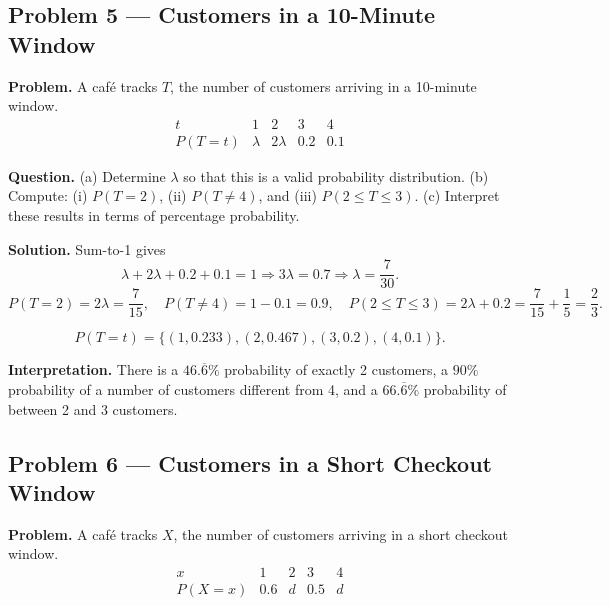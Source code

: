 \begin{ExamProblems}
		
		\item
		\subsection*{Problem 5 — Customers in a 10-Minute Window}
		
		\textbf{Problem.}
		A café tracks $T$, the number of customers arriving in a 10-minute window.
		\[
		\begin{array}{c|cccc}
			t & 1 & 2 & 3 & 4\\
			\hline
			P(T=t) & \lambda & 2\lambda & 0.2 & 0.1
		\end{array}
		\]
		
		\textbf{Question.}
		(a) Determine $\lambda$ so that this is a valid probability distribution.
		(b) Compute: (i) $P(T=2)$, (ii) $P(T\ne 4)$, and (iii) $P(2\le T\le 3)$.
		(c) Interpret these results in terms of percentage probability.
		
		\textbf{Solution.}
		Sum-to-1 gives
		\[
		\lambda+2\lambda+0.2+0.1=1\Rightarrow 3\lambda=0.7\Rightarrow \lambda=\frac{7}{30}.
		\]
		\[
		P(T=2)=2\lambda=\frac{7}{15},\quad
		P(T\ne 4)=1-0.1=0.9,\quad
		P(2\le T\le 3)=2\lambda+0.2=\frac{7}{15}+\frac{1}{5}=\frac{2}{3}.
		\]
		
\[
		P(T=t)=\{(1,0.233),(2,0.467),(3,0.2),(4,0.1)\}.
		\]
\begin{center}
		\end{center}
\textbf{Interpretation.} There is a $46.\overline{6}\%$ probability of exactly 2 customers, a $90\%$ probability of a number of customers different from 4, and a $66.\overline{6}\%$ probability of between 2 and 3 customers.
		
		
		\item
		\subsection*{Problem 6 — Customers in a Short Checkout Window}
			\textbf{Problem.}
		A café tracks $X$, the number of customers arriving in a short checkout window.
		\[
		\begin{array}{c|cccc}
			x & 1 & 2 & 3 & 4\\
			\hline
			P(X=x) & 0.6 & d & 0.5 & d
		\end{array}
		\]
		

\end{ExamProblems}
